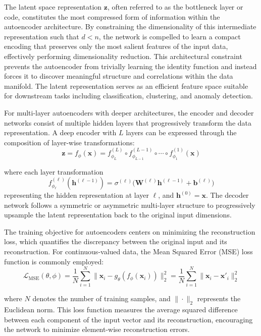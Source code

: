 \documentclass[12pt,a4paper]{report}
\begin{document}
The latent space representation $\mathbf{z}$, often referred to as the bottleneck layer or code, constitutes the most compressed form of information within the autoencoder architecture. By constraining the dimensionality of this intermediate representation such that $d < n$, the network is compelled to learn a compact encoding that preserves only the most salient features of the input data, effectively performing dimensionality reduction. This architectural constraint prevents the autoencoder from trivially learning the identity function and instead forces it to discover meaningful structure and correlations within the data manifold. The latent representation serves as an efficient feature space suitable for downstream tasks including classification, clustering, and anomaly detection.

For multi-layer autoencoders with deeper architectures, the encoder and decoder networks consist of multiple hidden layers that progressively transform the data representation. A deep encoder with $L$ layers can be expressed through the composition of layer-wise transformations:
\begin{equation}
\mathbf{z} = f_\phi(\mathbf{x}) = f^{(L)}_{\phi_L} \circ f^{(L-1)}_{\phi_{L-1}} \circ \cdots \circ f^{(1)}_{\phi_1}(\mathbf{x})
\end{equation}

where each layer transformation \begin{equation}
    f^{(\ell)}_{\phi_\ell}(\mathbf{h}^{(\ell-1)}) 
= \sigma^{(\ell)}\big(\mathbf{W}^{(\ell)} \mathbf{h}^{(\ell-1)} + \mathbf{b}^{(\ell)}\big)
\end{equation}
 representing the hidden representation at layer $\ell$, and $\mathbf{h}^{(0)} = \mathbf{x}$. The decoder network follows a symmetric or asymmetric multi-layer structure to progressively upsample the latent representation back to the original input dimensions.

The training objective for autoencoders centers on minimizing the reconstruction loss, which quantifies the discrepancy between the original input and its reconstruction. For continuous-valued data, the Mean Squared Error (MSE) loss function is commonly employed:
\begin{equation}
\mathcal{L}_{\text{MSE}}(\theta, \phi) = \frac{1}{N} \sum_{i=1}^{N} \|\mathbf{x}_i - g_\theta(f_\phi(\mathbf{x}_i))\|^2_2 = \frac{1}{N} \sum_{i=1}^{N} \|\mathbf{x}_i - \mathbf{x}'_i\|^2_2
\end{equation}

where $N$ denotes the number of training samples, and $\|\cdot\|_2$ represents the Euclidean norm. This loss function measures the average squared difference between each component of the input vector and its reconstruction, encouraging the network to minimize element-wise reconstruction errors.
\end{document}
